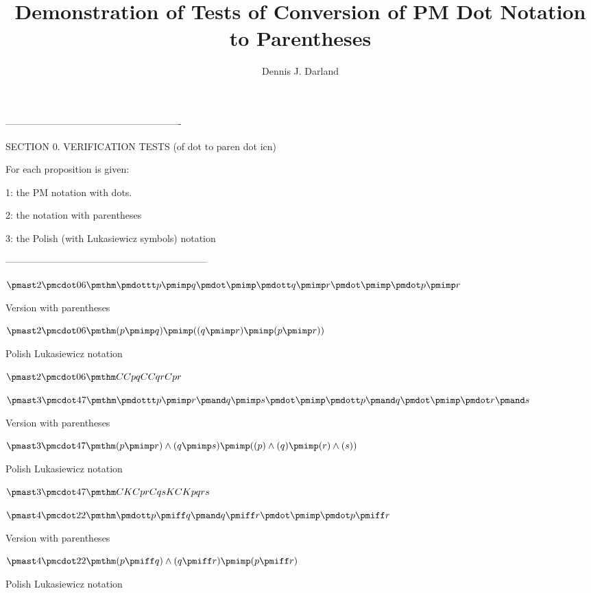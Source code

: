 \documentclass[12pt]{article}
\begin{document}
\title{Demonstration of Tests of Conversion of PM Dot Notation to Parentheses}
\author{Dennis J. Darland}
\maketitle

-------------------------------------------------------

SECTION 0. VERIFICATION TESTS (of dot to paren dot icn)

For each proposition is given:

1: the PM notation with dots.

2: the notation with parentheses 

3: the Polish (with Lukasiewicz symbols) notation

---------------------------------------------------------------

$\pmast 2 \pmcdot 06 \pmthm \pmdottt p \pmimp q \pmdot \pmimp \pmdott q \pmimp r \pmdot \pmimp \pmdot p \pmimp r $
 
 

Version with parentheses

$\pmast 2 \pmcdot 06 \pmthm  (  p \pmimp q  ) \pmimp ((  q \pmimp r  ) \pmimp (  p \pmimp r ))$


Polish Lukasiewicz notation

$\pmast 2 \pmcdot 06 \pmthm  C    C   p   q     C    C   q   r     C   p   r  $


$\pmast 3 \pmcdot 47 \pmthm \pmdottt p \pmimp r \pmand q \pmimp s \pmdot \pmimp \pmdott p \pmand q \pmdot \pmimp \pmdot r \pmand s $
 
 

Version with parentheses

$\pmast 3 \pmcdot 47 \pmthm  (  p \pmimp r ) \land ( q \pmimp s  ) \pmimp ((  p ) \land ( q  ) \pmimp (  r ) \land ( s ))$


Polish Lukasiewicz notation

$\pmast 3 \pmcdot 47 \pmthm  C    K    C   p   r    C   q   s     K    C    K   p   q    r   s  $


$\pmast 4 \pmcdot 22 \pmthm \pmdott p \pmiff q \pmand q \pmiff r \pmdot \pmimp \pmdot p \pmiff r$
 
 

Version with parentheses

$\pmast 4 \pmcdot 22 \pmthm  (  p \pmiff q ) \land ( q \pmiff r  ) \pmimp (  p \pmiff r)$


Polish Lukasiewicz notation
\end{document}
